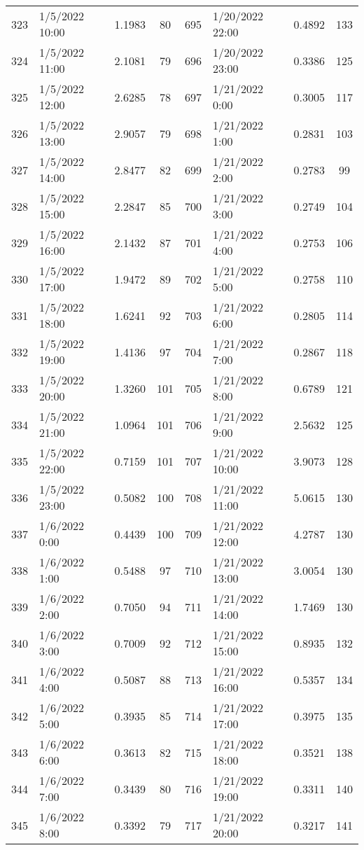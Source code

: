 \begin{center}
\begin{longtable}{llccllcc}
    323&1/5/2022 10:00	   &1.1983&80 &695&1/20/2022 22:00	    &0.4892&133 \\
    324&1/5/2022 11:00	   &2.1081&79 &696&1/20/2022 23:00	    &0.3386&125 \\
    325&1/5/2022 12:00	   &2.6285&78 &697&1/21/2022 0:00	    &0.3005&117 \\
    326&1/5/2022 13:00	   &2.9057&79 &698&1/21/2022 1:00	    &0.2831&103 \\
    327&1/5/2022 14:00	   &2.8477&82 &699&1/21/2022 2:00	    &0.2783&99  \\
    328&1/5/2022 15:00	   &2.2847&85 &700&1/21/2022 3:00	    &0.2749&104 \\
    329&1/5/2022 16:00	   &2.1432&87 &701&1/21/2022 4:00	    &0.2753&106 \\
    330&1/5/2022 17:00	   &1.9472&89 &702&1/21/2022 5:00	    &0.2758&110 \\
    331&1/5/2022 18:00	   &1.6241&92 &703&1/21/2022 6:00	    &0.2805&114 \\
    332&1/5/2022 19:00	   &1.4136&97 &704&1/21/2022 7:00	    &0.2867&118 \\
    333&1/5/2022 20:00	   &1.3260&101&705&1/21/2022 8:00	    &0.6789&121 \\
    334&1/5/2022 21:00	   &1.0964&101&706&1/21/2022 9:00	    &2.5632&125 \\
    335&1/5/2022 22:00	   &0.7159&101&707&1/21/2022 10:00	    &3.9073&128 \\
    336&1/5/2022 23:00	   &0.5082&100&708&1/21/2022 11:00	    &5.0615&130 \\
    337&1/6/2022 0:00	   &0.4439&100&709&1/21/2022 12:00	    &4.2787&130 \\
    338&1/6/2022 1:00	   &0.5488&97 &710&1/21/2022 13:00	    &3.0054&130 \\
    339&1/6/2022 2:00	   &0.7050&94 &711&1/21/2022 14:00	    &1.7469&130 \\
    340&1/6/2022 3:00	   &0.7009&92 &712&1/21/2022 15:00	    &0.8935&132 \\
    341&1/6/2022 4:00	   &0.5087&88 &713&1/21/2022 16:00	    &0.5357&134 \\
    342&1/6/2022 5:00	   &0.3935&85 &714&1/21/2022 17:00	    &0.3975&135 \\
    343&1/6/2022 6:00	   &0.3613&82 &715&1/21/2022 18:00	    &0.3521&138 \\
    344&1/6/2022 7:00	   &0.3439&80 &716&1/21/2022 19:00	    &0.3311&140 \\
    345&1/6/2022 8:00	   &0.3392&79 &717&1/21/2022 20:00	    &0.3217&141 \\

\end{longtable}
\end{center}
